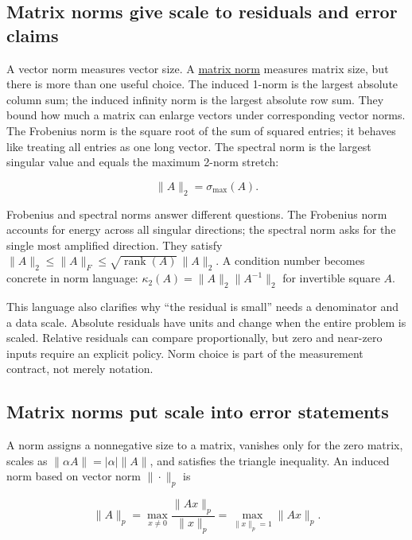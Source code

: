 \subsection{Matrix norms give scale to residuals and error claims}\label{01-foundations-i-ch019-matrix-norms-give-scale-to-residuals-and-error-claims}

A vector norm measures vector size. A \hyperref[01-foundations-i-ch019-matrix-norms-put-scale-into-error-statements]{matrix norm} measures matrix size, but there is more than one useful choice. The induced 1-norm is the largest absolute column sum; the induced infinity norm is the largest absolute row sum. They bound how much a matrix can enlarge vectors under corresponding vector norms. The Frobenius norm is the square root of the sum of squared entries; it behaves like treating all entries as one long vector. The spectral norm is the largest singular value and equals the maximum 2-norm stretch:

\[
\|A\|_2=\sigma_{\max}(A).
\]

Frobenius and spectral norms answer different questions. The Frobenius norm accounts for energy across all singular directions; the spectral norm asks for the single most amplified direction. They satisfy \(\|A\|_2\le\|A\|_F\le\sqrt{\operatorname{rank}(A)}\,\|A\|_2\). A condition number becomes concrete in norm language: \(\kappa_2(A)=\|A\|_2\|A^{-1}\|_2\) for invertible square \(A\).

This language also clarifies why ``the residual is small'' needs a denominator and a data scale. Absolute residuals have units and change when the entire problem is scaled. Relative residuals can compare proportionally, but zero and near-zero inputs require an explicit policy. Norm choice is part of the measurement contract, not merely notation.

\subsection{Matrix norms put scale into error statements}\label{01-foundations-i-ch019-matrix-norms-put-scale-into-error-statements}

A norm assigns a nonnegative size to a matrix, vanishes only for the zero matrix, scales as \(\|\alpha A\|=|\alpha|\|A\|\), and satisfies the triangle inequality. An induced norm based on vector norm \(\|\cdot\|_p\) is

\[
\|A\|_p=\max_{x\ne0}\frac{\|Ax\|_p}{\|x\|_p}
=\max_{\|x\|_p=1}\|Ax\|_p.
\]

